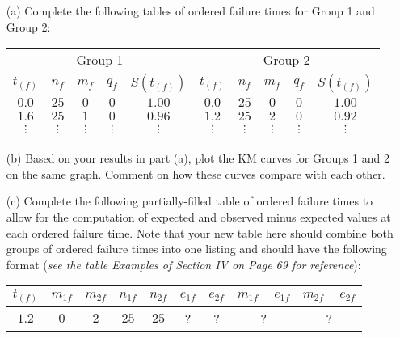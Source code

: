 \documentclass[12pt]{article}
\begin{document}
\begin{itemize}
	\item[(a)] Complete the following tables of ordered failure times for Group 1 and Group 2:
	
\begin{center}
\begin{tabular}{ c c c c c | c c c c c }
 \multicolumn{5}{c}{Group 1} & \multicolumn{5}{c}{Group 2} \\

 $t_{(f)}$ & $n_f$ & $m_{f}$ & $q_{f}$ & $S(t_{(f)})$   & $t_{(f)}$ & $n_f$ & $m_{f}$ & $q_{f}$ & $S(t_{(f)})$ \\

 \hline

 $0.0$ & $25$ & $0$ & $0$ & $1.00$    & $0.0$ & $25$ & $0$ & $0$ & $1.00$ \\

 $1.6$ & $25$ & $1$ & $0$ & $0.96$    & $1.2$ & $25$ & $2$ & $0$ & $0.92$ \\

 $\vdots$ & $\vdots$ & $\vdots$ & $\vdots$ & $\vdots$    & $\vdots$ & $\vdots$ & $\vdots$ & $\vdots$ & $\vdots$
\end{tabular}
\end{center}

	\item[(b)] Based on your results in part (a), plot the KM curves for Groups 1 and 2 on the same graph. Comment on how these curves compare with each other.
	
	\item[(c)] Complete the following partially-filled table of ordered failure times to allow for the computation of expected and observed minus expected values at each ordered failure time. Note that your new table here should combine both groups of ordered failure times into one listing and should have the following format (\textit{see the table Examples of Section IV on Page 69 for reference}):
	
	\begin{center}
\begin{tabular}{ c | c c | c c | c c | c c }

 $t_{(f)}$ & $m_{1f}$ & $m_{2f}$ & $n_{1f}$ & $n_{2f}$   & $e_{1f}$ & $e_{2f}$ & $m_{1f} - e_{1f}$ & $m_{2f} - e_{2f}$ \\

 \hline

 $1.2$ & $0$ & $2$ & $25$ & $25$    & ? & ? & ? & ? \\


\end{tabular}
\end{center}
\end{itemize}
\end{document}
